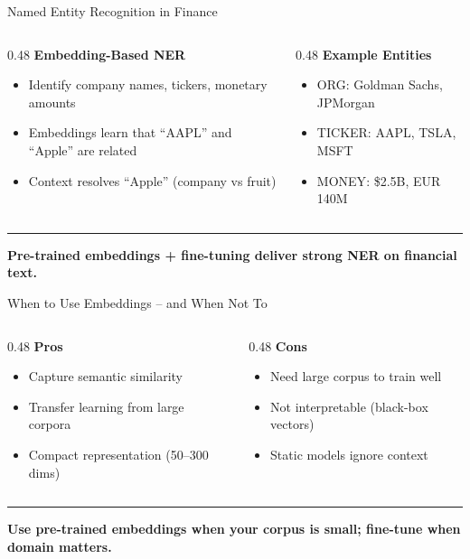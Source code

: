 \documentclass[8pt,aspectratio=169]{beamer}
\newcommand{\bottomnote}[1]{%
\vfill
\vspace{-2mm}
\textcolor{mllavender2}{\rule{\textwidth}{0.4pt}}
\vspace{1mm}
\footnotesize
\textbf{#1}
}
\newenvironment{compactlist}{%
  \begin{itemize}%
    \setlength{\itemsep}{2pt}%
    \setlength{\parskip}{0pt}%
    \setlength{\parsep}{0pt}%
}{%
  \end{itemize}%
}
\begin{document}
\begin{frame}{Named Entity Recognition in Finance}
\begin{columns}[T]
\begin{column}{0.48\textwidth}
\textbf{Embedding-Based NER}
\begin{compactlist}
  \item Identify company names, tickers, monetary amounts
  \item Embeddings learn that ``AAPL'' and ``Apple'' are related
  \item Context resolves ``Apple'' (company vs fruit)
\end{compactlist}
\end{column}
\begin{column}{0.48\textwidth}
\textbf{Example Entities}
\begin{compactlist}
  \item \textcolor{mlblue}{ORG}: Goldman Sachs, JPMorgan
  \item \textcolor{mlgreen}{TICKER}: AAPL, TSLA, MSFT
  \item \textcolor{mlorange}{MONEY}: \$2.5B, EUR 140M
\end{compactlist}
\end{column}
\end{columns}

\bottomnote{Pre-trained embeddings + fine-tuning deliver strong NER on financial text.}
\end{frame}


\begin{frame}{When to Use Embeddings -- and When Not To}
\begin{columns}[T]
\begin{column}{0.48\textwidth}
\textbf{\textcolor{mlgreen}{Pros}}
\begin{compactlist}
  \item Capture semantic similarity
  \item Transfer learning from large corpora
  \item Compact representation (50--300 dims)
\end{compactlist}
\end{column}
\begin{column}{0.48\textwidth}
\textbf{\textcolor{mlred}{Cons}}
\begin{compactlist}
  \item Need large corpus to train well
  \item Not interpretable (black-box vectors)
  \item Static models ignore context
\end{compactlist}
\end{column}
\end{columns}

\bottomnote{Use pre-trained embeddings when your corpus is small; fine-tune when domain matters.}
\end{frame}
\end{document}
